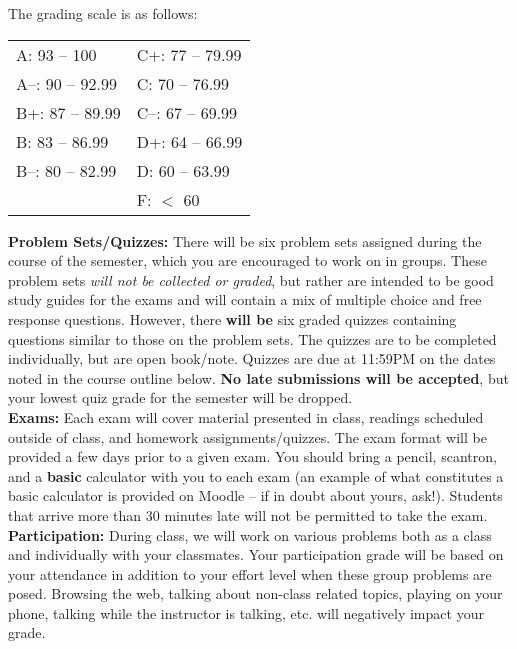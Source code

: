 \documentclass[11pt]{article}
\begin{document}
The grading scale is as follows:
\begin{center}
	\begin{tabular}{ p{3.5cm} p{3.5cm} }
		A: 93 -- 100 &  C+: 77 -- 79.99\\
		A--: 90 -- 92.99 & C: 70 -- 76.99\\
		B+: 87 -- 89.99 & C--: 67 -- 69.99\\
		B: 83 -- 86.99 & D+: 64 -- 66.99\\
		B--: 80 -- 82.99 & D: 60 -- 63.99\\
		& F: $<$ 60
		
		
	\end{tabular}
\end{center}


\textbf{Problem Sets/Quizzes:} There will be six problem sets assigned during the course of the semester, which you are encouraged to work on in groups. These problem sets \textit{will not be collected or graded}, but rather are intended to be good study guides for the exams and will contain a mix of multiple choice and free response questions. However, there \textbf{will be} six graded quizzes containing questions similar to those on the problem sets. The quizzes are to be completed individually, but are open book/note. Quizzes are due at 11:59PM on the dates noted in the course outline below. \textbf{No late submissions will be accepted}, but your lowest quiz grade for the semester will be dropped. \\

\textbf{Exams:} Each exam will cover material presented in class, readings scheduled outside of class, and homework assignments/quizzes. The exam format will be provided a few days prior to a given exam. You should bring a pencil, scantron, and a \textbf{basic} calculator with you to each exam (an example of what constitutes a basic calculator is provided on Moodle -- if in doubt about yours, ask!). Students that arrive more than 30 minutes late will not be permitted to take the exam. 
\\

\textbf{Participation:} During class, we will work on various problems both as a class and individually with your classmates. Your participation grade will be based on your attendance in addition to your effort level when these group problems are posed. Browsing the web, talking about non-class related topics, playing on your phone, talking while the instructor is talking, etc. will negatively impact your grade.
\\
\end{document}
